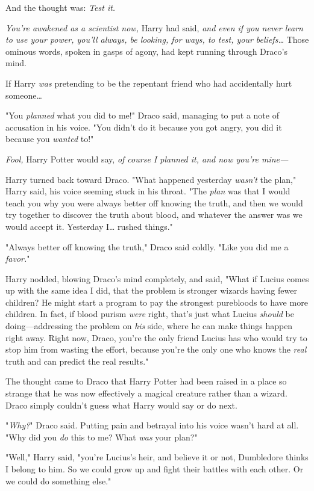 And the thought was: \emph{Test it.}

\emph{You're awakened as a scientist now,} Harry had said, \emph{and even if
you never learn to use your power, you'll always, be looking, for ways, to
test, your beliefs{\ldots}} Those ominous words, spoken in gasps of agony, had
kept running through Draco's mind.

If Harry \emph{was} pretending to be the repentant friend who had accidentally
hurt someone{\ldots}

"You \emph{planned} what you did to me!" Draco said, managing to put a note of
accusation in his voice. "You didn't do it because you got angry, you did it
because you \emph{wanted} to!"

\emph{Fool,} Harry Potter would say, \emph{of course I planned it, and now
you're mine---}

Harry turned back toward Draco. "What happened yesterday \emph{wasn't} the
plan," Harry said, his voice seeming stuck in his throat. "The \emph{plan} was
that I would teach you why you were always better off knowing the truth, and
then we would try together to discover the truth about blood, and whatever the
answer was we would accept it. Yesterday I{\ldots} rushed things."

"Always better off knowing the truth," Draco said coldly. "Like you did me a
\emph{favor.}"

Harry nodded, blowing Draco's mind completely, and said, "What if Lucius comes
up with the same idea I did, that the problem is stronger wizards having fewer
children? He might start a program to pay the strongest purebloods to have more
children. In fact, if blood purism \emph{were} right, that's just what Lucius
\emph{should} be doing---addressing the problem on \emph{his} side, where he
can make things happen right away. Right now, Draco, you're the only friend
Lucius has who would try to stop him from wasting the effort, because you're
the only one who knows the \emph{real} truth and can predict the real results."

The thought came to Draco that Harry Potter had been raised in a place so
strange that he was now effectively a magical creature rather than a wizard.
Draco simply couldn't guess what Harry would say or do next.

"\emph{Why?}" Draco said. Putting pain and betrayal into his voice wasn't hard
at all. "Why did you \emph{do} this to me? What \emph{was} your plan?"

"Well," Harry said, "you're Lucius's heir, and believe it or not, Dumbledore
thinks I belong to him. So we could grow up and fight their battles with each
other. Or we could do something else."


